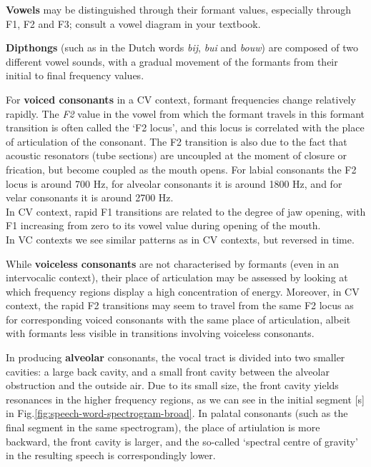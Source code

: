 \documentclass[
]{book}
\begin{document}
\textbf{Vowels} may be distinguished through their formant values, especially through F1, F2 and F3; consult a vowel diagram in your textbook.

\textbf{Dipthongs} (such as in the Dutch words \emph{bij}, \emph{bui} and \emph{bouw}) are composed of two different vowel sounds, with a gradual movement of the formants from their initial to final frequency values.

For \textbf{voiced consonants} in a CV context, formant frequencies change relatively rapidly. The \emph{F2} value in the vowel from which the formant travels in this formant transition is often called the `F2 locus', and this locus is correlated with the place of articulation of the consonant. The F2 transition is also due to the fact that acoustic resonators (tube sections) are uncoupled at the moment of closure or frication, but become coupled as the mouth opens.
For labial consonants the F2 locus is around 700 Hz, for alveolar consonants it is around 1800 Hz, and for velar consonants it is around 2700 Hz.\\
In CV context, rapid F1 transitions are related to the degree of jaw opening, with F1 increasing from zero to its vowel value during opening of the mouth.\\
In VC contexts we see similar patterns as in CV contexts, but reversed in time.

While \textbf{voiceless consonants} are not characterised by formants (even in an intervocalic context), their place of articulation may be assessed by looking at which frequency regions display a high concentration of energy. Moreover, in CV context, the rapid F2 transitions may seem to travel from the same F2 locus as for corresponding voiced consonants with the same place of articulation, albeit with formants less visible in transitions involving voiceless consonants.

In producing \textbf{alveolar} consonants, the vocal tract is divided into two smaller cavities: a large back cavity, and a small front cavity between the alveolar obstruction and the outside air. Due to its small size, the front cavity yields resonances in the higher frequency regions, as we can see in the initial segment {[}s{]} in Fig.\ref{fig:speech-word-spectrogram-broad}. In palatal consonants (such as the final segment in the same spectrogram), the place of artiulation is more backward, the front cavity is larger, and the so-called `spectral centre of gravity' in the resulting speech is correspondingly lower.
\end{document}
